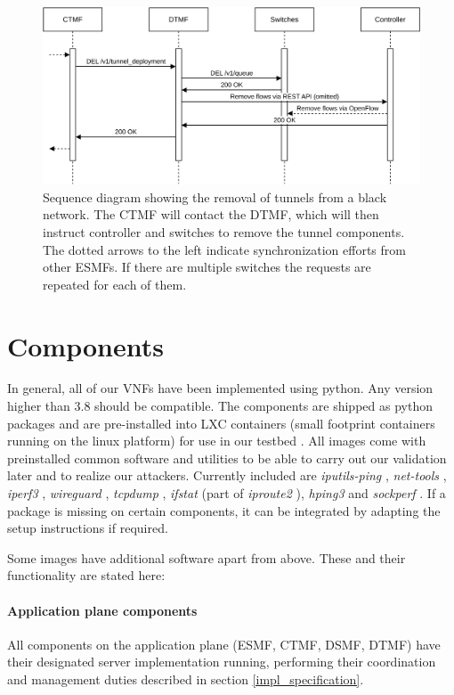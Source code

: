 \begin{figure}[H]
  \centering
  \includegraphics[width=\linewidth]{images/chapter_6/slice_removal_bn.png}
  \caption[Slice removal from a black network]{Sequence diagram showing the removal of tunnels from a black network. The CTMF will contact the DTMF, which will then instruct controller and switches to remove the tunnel components. The dotted arrows to the left indicate synchronization efforts from other ESMFs. If there are multiple switches the requests are repeated for each of them.}
  \label{fig:slice_removal_bn}
\end{figure}

\newpage

\section{Components}
In general, all of our VNFs have been implemented using python. Any version higher than 3.8 should be compatible. The components are shipped as python packages and are pre-installed into LXC containers (small footprint containers running on the linux platform) \cite{lxc} for use in our testbed \cite{owntb}. All images come with preinstalled common software and utilities to be able to carry out our validation later and to realize our attackers. Currently included are \textit{iputils-ping} \cite{iputils}, \textit{net-tools} \cite{net-tools}, \textit{iperf3} \cite{iperf3}, \textit{wireguard} \cite{wireguard}, \textit{tcpdump} \cite{tcpdump}, \textit{ifstat} (part of \textit{iproute2} \cite{iproute2}), \textit{hping3} \cite{hping3} and \textit{sockperf} \cite{sockperf}. If a package is missing on certain components, it can be integrated by adapting the setup instructions if required.

Some images have additional software apart from above. These and their functionality are stated here:
\paragraph{Application plane components} All components on the application plane (ESMF, CTMF, DSMF, DTMF) have their designated server implementation running, performing their coordination and management duties described in section \ref{impl_specification}.
